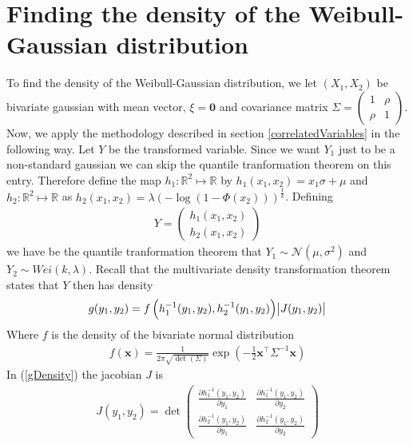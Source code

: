 \section{Finding the density of the Weibull-Gaussian distribution}\label{weibullGaussianAppendix}
To find the density of the Weibull-Gaussian distribution, we let $(X_1, X_2)$ be bivariate gaussian with mean vector, $\xi = \mathbf{0}$ and covariance matrix $\Sigma = \begin{pmatrix}
    1 & \rho \\
    \rho & 1
\end{pmatrix}$. Now, we apply the methodology described in section \ref{correlatedVariables} in the following way. Let $Y$ be the transformed variable. Since we want $Y_1$ just to be a non-standard gaussian we can skip the quantile tranformation theorem on this entry. Therefore define the map $h_1: \mathbb{R}^2 \mapsto \mathbb{R}$ by $h_1(x_1, x_2) = x_1\sigma + \mu$ and $h_2:\mathbb{R}^2 \mapsto \mathbb{R}$ as $ h_2(x_1, x_2) = \lambda\left(-\log\left(1-\Phi(x_2)\right)\right)^{\frac{1}{k}}$. Defining 
\begin{align}
    Y = \begin{pmatrix}
        h_1(x_1, x_2)\\
        h_2(x_1, x_2)
    \end{pmatrix}    
\end{align}
we have be the quantile tranformation theorem that
$Y_1 \sim \mathcal{N}(\mu, \sigma^2)$ and $Y_2 \sim Wei(k, \lambda)$. Recall that the multivariate density transformation theorem states that $Y$ then has density
\begin{align}
    g(y_1, y_2) = f\left(h_1^{-1}(y_1, y_2), h_2^{-1}(y_1, y_2)\right)\abs{J(y_1, y_2)} \label{gDensity}
\end{align}
Where $f$ is the density of the bivariate normal distribution
\begin{align}
    f(\mathbf{x}) = \frac{1}{2\pi\sqrt{\det(\Sigma)}}\exp\left(-\frac{1}{2}\mathbf{x}^\top \Sigma^{-1}\mathbf{x}\right)
\end{align}
In (\ref{gDensity}) the jacobian $J$ is 
\begin{align}
    J(y_1, y_2) = \det\left(\begin{matrix}
        \frac{\partial h_1^{-1}(y_1, y_2)}{\partial y_1} & \frac{\partial h_1^{-1}(y_1, y_2)}{\partial y_2} \\
        \frac{\partial h_2^{-1}(y_1, y_2)}{\partial y_1} & \frac{\partial h_2^{-1}(y_1, y_2)}{\partial y_2}
    \end{matrix}\right)  
\end{align}
